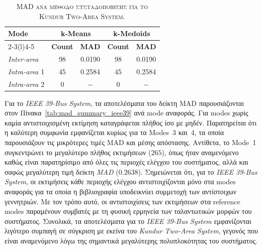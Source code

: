 \documentclass[conference]{IEEEtran}
\begin{document}
\begin{table}[!t]
\centering
\caption{\textsc{MAD ανά μέθοδο συσταδοποίησης για το Kundur Two-Area System.}}
\label{tab:mad_summary_kundur}
\small
\renewcommand{\arraystretch}{1.2}
\setlength{\tabcolsep}{7pt}
\begin{tabular}{lcccc}
\toprule
\textbf{Mode} & \multicolumn{2}{c}{\textbf{k-Means}} & \multicolumn{2}{c}{\textbf{k-Medoids}} \\
\cmidrule(lr){2-3}\cmidrule(l){4-5}
 & \textbf{Count} & \textbf{MAD} & \textbf{Count} & \textbf{MAD} \\
\midrule
\textit{Inter-area}   & 98 & 0.0190 & 98 & 0.0190 \\
\textit{Intra-area} 1 & 45 & 0.2584 & 45 & 0.2584 \\
\textit{Intra-area} 2 & 0  & $-$     & 0  & $-$     \\
\bottomrule
\end{tabular}
\end{table}

Για το \textit{IEEE 39-Bus System}, τα αποτελέσματα του δείκτη MAD παρουσιάζονται στον
Πίνακα~\ref{tab:mad_summary_ieee39} ανά mode αναφοράς. Για modes χωρίς καμία
αντιστοιχισμένη εκτίμηση καταγράφεται πλήθος ίσο με μηδέν. Παρατηρείται ότι η καλύτερη
συμφωνία εμφανίζεται κυρίως για τα Modes~3 και~4, τα οποία παρουσιάζουν τις μικρότερες τιμές MAD
και μέσης απόστασης. Αντίθετα, το Mode~1 συγκεντρώνει το μεγαλύτερο πλήθος εκτιμήσεων ($265$), όπως ήταν αναμενόμενο καθώς είναι παρατηρίσιμο από όλες τις περιοχές ελέγχου του συστήματος, αλλά και σαφώς μεγαλύτερη τιμή δείκτη \textit{MAD} ($0.2638$). Σημειώνεται ότι, για το \textit{IEEE 39-Bus System}, οι εκτιμήσεις κάθε περιοχής ελέγχου αντιστοιχίζονται μόνο στα modes αναφοράς για τα οποία η βιβλιογραφία υποδεικνύει συμμετοχή των αντίστοιχων γεννητριών. Με τον τρόπο αυτό, οι αντιστοιχίσεις των εκτιμήσεων στα reference modes παραμένουν συμβατές με τη φυσική ερμηνεία των ταλαντωτικών μορφών του συστήματος.
Συνολικά, τα αποτελέσματα για το \textit{IEEE 39-Bus System} εμφανίζονται λιγότερο συμπαγή σε σύγκριση με εκείνα του \textit{Kundur Two-Area System}, γεγονός που είναι αναμενόμενο λόγω της σημαντικά μεγαλύτερης πολυπλοκότητας του συστήματος.
\end{document}
